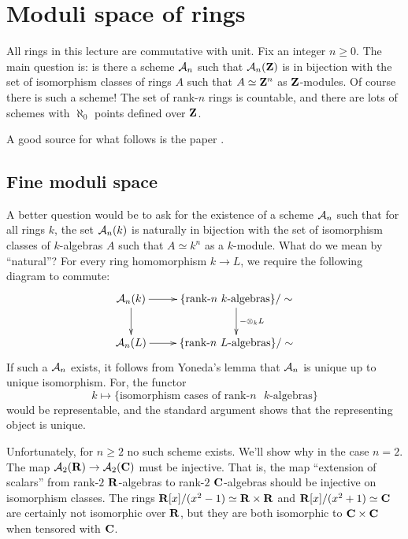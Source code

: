 
\section{Moduli space of rings}\label{sec:poonen}





All rings in this lecture are commutative with unit. Fix an integer 
$n\geqslant 0$. The main question is: is there a scheme $\mathcal{A}_n$ such that 
$\mathcal{A}_n(\mathbf{Z})$ is in bijection with the set of isomorphism classes of 
rings $A$ such that $A\simeq \mathbf{Z}^n$ as $\mathbf{Z}$-modules. Of course there is such 
a scheme! The set of rank-$n$ rings is countable, and there are lots of 
schemes with $\aleph_0$ points defined over $\mathbf{Z}$. 

A good source for what follows is the paper \cite{p08}. 





\subsection{Fine moduli space}

A better question would be to ask for the existence of a scheme $\mathcal{A}_n$ such 
that for all rings $k$, the set $\mathcal{A}_n(k)$ is naturally in bijection with the 
set of isomorphism classes of $k$-algebras $A$ such that $A\simeq k^n$ as a 
$k$-module. What do we mean by ``natural''? For every ring homomorphism 
$k\to L$, we require the following diagram to commute:
\[\xymatrix{
  \cA_n(k) \ar[r] \ar[d] 
    & \{\text{rank-$n$ $k$-algebras}\}/\sim \ar[d]^-{-\otimes_k L} \\
  \cA_n(L) \ar[r] 
    & \{\text{rank-$n$ $L$-algebras}\} /\sim
}\]
If such a $\mathcal{A}_n$ exists, it follows from Yoneda's lemma that $\mathcal{A}_n$ is 
unique up to unique isomorphism. For, the functor 
\[
  k\mapsto \{\text{isomorphism cases of rank-$n$ $k$-algebras}\} 
\]
would be representable, and the standard argument shows that the representing 
object is unique. 

Unfortunately, for $n\geqslant 2$ no such scheme exists. We'll show why in the 
case $n=2$. The map $\mathcal{A}_2(\mathbf{R}) \to \mathcal{A}_2(\mathbf{C})$ must be injective. That is, the 
map ``extension of scalars'' from rank-$2$ $\mathbf{R}$-algebras to rank-$2$ 
$\mathbf{C}$-algebras should be injective on isomorphism classes. The rings 
$\mathbf{R}[x]/(x^2-1)\simeq \mathbf{R}\times \mathbf{R}$ and $\mathbf{R}[x]/(x^2+1)\simeq \mathbf{C}$ are 
certainly not isomorphic over $\mathbf{R}$, but they are both isomorphic to 
$\mathbf{C}\times \mathbf{C}$ when tensored with $\mathbf{C}$. 

